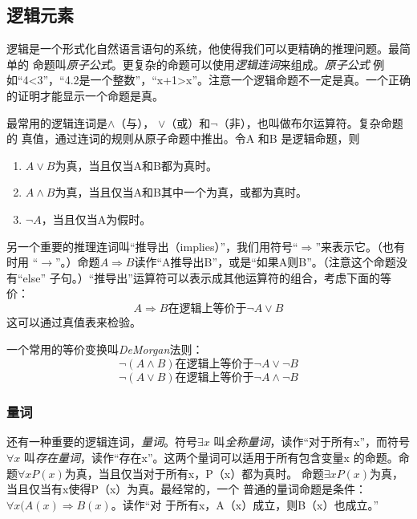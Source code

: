 \subsection{逻辑元素}\label{Sec:LogicElement}
逻辑是一个形式化自然语言语句的系统，他使得我们可以更精确的推理问题。最简单的
命题叫\emph{原子公式}。更复杂的命题可以使用\emph{逻辑连词}来组成。\emph{原子公式}
例如“4<3”，“4.2是一个整数”，“x+1>x”。注意一个逻辑命题不一定是真。一个正确
的证明才能显示一个命题是真。

最常用的逻辑连词是$\wedge$（与），
$\vee$（或）和$\neg$（非），也叫做布尔运算符。复杂命题的
真值，通过连词的规则从原子命题中推出。令A 和B 是逻辑命题，则
\begin{enumerate}
    \item $A \vee B$为真，当且仅当A和B都为真时。
    \item $A \wedge B$为真，当且仅当A和B其中一个为真，或都为真时。
    \item $\neg A$，当且仅当A为假时。
\end{enumerate}
另一个重要的推理连词叫“推导出（implies）”，我们用符号“$\Rightarrow$”来表示它。（也有时用
“$\rightarrow$”。）命题$A \Rightarrow
B$读作“A推导出B”，或是“如果A则B”。（注意这个命题没有“else”
子句。）“推导出”运算符可以表示成其他运算符的组合，考虑下面的等价：
\begin{equation}\label{Equa:ImplyLaw}
    A \Rightarrow B \mbox{在逻辑上等价于} \neg A \vee B
\end{equation}
这可以通过真值表来检验。

一个常用的等价变换叫\emph{DeMorgan}法则：
\begin{equation}
    \neg (A \wedge B) \mbox{在逻辑上等价于} \neg A \vee \neg B
\end{equation}
\begin{equation}
    \neg (A \vee B) \mbox{在逻辑上等价于} \neg A \wedge \neg B
\end{equation}


\subsubsection{量词}
还有一种重要的逻辑连词，\emph{量词}。符号$\exists x$
叫\emph{全称量词}，读作“对于所有x”，而符号$\forall x$
叫\emph{存在量词}，读作“存在x”。这两个量词可以适用于所有包含变量x
的命题。命题$\forall xP(x)$为真，当且仅当对于所有x，P（x）都为真时。
命题$\exists xP(x)$为真，当且仅当有x使得P（x）为真。最经常的，一个
普通的量词命题是条件：$\forall x(A(x) \Rightarrow B(x)$。读作“对
于所有x，A（x）成立，则B（x）也成立。”

